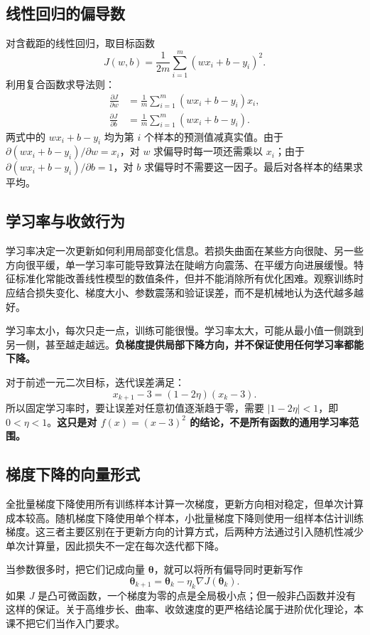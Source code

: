 \subsection{线性回归的偏导数}

对含截距的线性回归，取目标函数
\[
J(w,b)=\frac1{2m}\sum_{i=1}^{m}(wx_i+b-y_i)^2.
\]
利用复合函数求导法则：
\begin{equation}\label{eq:gd-lm-partials}
\begin{aligned}
\frac{\partial J}{\partial w}&=\frac1m\sum_{i=1}^{m}(wx_i+b-y_i)x_i,\\
\frac{\partial J}{\partial b}&=\frac1m\sum_{i=1}^{m}(wx_i+b-y_i).
\end{aligned}
\end{equation}
两式中的 $wx_i+b-y_i$ 均为第 $i$ 个样本的预测值减真实值。由于 $\partial(wx_i+b-y_i)/\partial w=x_i$，对 $w$ 求偏导时每一项还需乘以 $x_i$；由于 $\partial(wx_i+b-y_i)/\partial b=1$，对 $b$ 求偏导时不需要这一因子。最后对各样本的结果求平均。

\subsection{学习率与收敛行为}

学习率决定一次更新如何利用局部变化信息。若损失曲面在某些方向很陡、另一些方向很平缓，单一学习率可能导致算法在陡峭方向震荡、在平缓方向进展缓慢。特征标准化常能改善线性模型的数值条件，但并不能消除所有优化困难。观察训练时应结合损失变化、梯度大小、参数震荡和验证误差，而不是机械地认为迭代越多越好。

学习率太小，每次只走一点，训练可能很慢。学习率太大，可能从最小值一侧跳到另一侧，甚至越走越远。\textbf{负梯度提供局部下降方向，并不保证使用任何学习率都能下降。}

对于前述一元二次目标，迭代误差满足：
\[
x_{k+1}-3=(1-2\eta)(x_k-3).
\]
所以固定学习率时，要让误差对任意初值逐渐趋于零，需要 $|1-2\eta|<1$，即 $0<\eta<1$。\textbf{这只是对 $f(x)=(x-3)^2$ 的结论，不是所有函数的通用学习率范围。}

\subsection{梯度下降的向量形式}

全批量梯度下降使用所有训练样本计算一次梯度，更新方向相对稳定，但单次计算成本较高。随机梯度下降使用单个样本，小批量梯度下降则使用一组样本估计训练梯度。这三者主要区别在于更新方向的计算方式，后两种方法通过引入随机性减少单次计算量，因此损失不一定在每次迭代都下降。

当参数很多时，把它们记成向量 $\boldsymbol\theta$，就可以将所有偏导同时更新写作
\[
\boldsymbol\theta_{k+1}
=\boldsymbol\theta_k-\eta_k\nabla J(\boldsymbol\theta_k).
\]
如果 $J$ 是凸可微函数，一个梯度为零的点是全局极小点；但一般非凸函数并没有这样的保证。关于高维步长、曲率、收敛速度的更严格结论属于进阶优化理论，本课不把它们当作入门要求。
